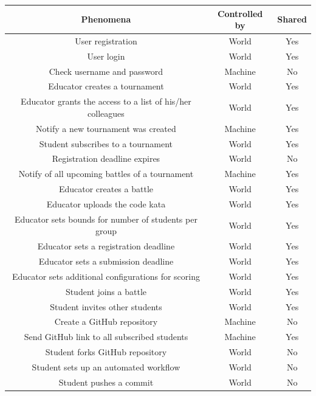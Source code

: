 \documentclass[12pt,oneside,a4paper]{article}
\begin{document}
\begin{table}[htbp]
    \centering
    \begin{adjustbox}{center}
    \begin{tabular}{|c|c|c|}
        
        \hline
        \rowcolor{blue!50}
        \textbf{Phenomena} & \textbf{Controlled by} & \textbf{Shared} \\
        \hline
        User registration & World & Yes \\
        User login & World & Yes \\
        Check username and password & Machine & No \\
        Educator creates a tournament & World & Yes \\
        Educator grants the access to a list of his/her colleagues & World & Yes\\
        Notify a new tournament was created & Machine & Yes\\
        Student subscribes to a tournament & World & Yes\\
        Registration deadline expires & World & No\\
        Notify of all upcoming battles of a tournament & Machine & Yes\\
        Educator creates a battle & World & Yes \\
        Educator uploads the code kata & World & Yes\\
        Educator sets bounds for number of students per group & World & Yes\\
        Educator sets a registration deadline & World & Yes\\
        Educator sets a submission deadline & World & Yes\\
        Educator sets additional configurations for scoring & World & Yes\\
        Student joins a battle & World & Yes\\
        Student invites other students & World & Yes\\
        Create a GitHub repository & Machine & No\\
        Send GitHub link to all subscribed students & Machine & Yes\\
        Student forks GitHub repository & World & No\\
        Student sets up an automated workflow & World & No\\
        Student pushes a commit & World & No\\

\end{tabular}
\end{adjustbox}
\end{table}
\end{document}
